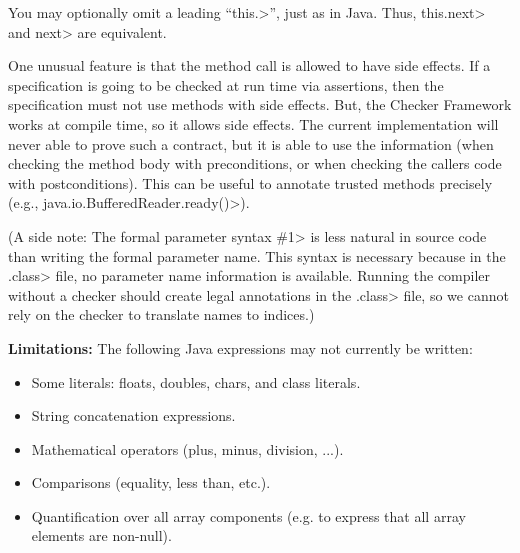 You may optionally omit a leading ``\<this.>'', just as in Java.  Thus, 
\<this.next> and \<next> are equivalent.

One unusual feature is that the method call is allowed to have side
effects.  If a specification is going to be checked at run time via
assertions, then the specification must not use methods with side
effects.  But, the Checker Framework works at compile time, so it allows
side effects.
The current implementation will never able to prove such
a contract, but it is able to use the information (when checking
the method body with preconditions, or when checking the callers
code with postconditions).  This can be useful to annotate trusted
methods precisely (e.g., \<java.io.BufferedReader.ready()>).


(A side note:  The formal parameter syntax \<\#1> is less natural in source code
than writing the formal parameter name.  This syntax is necessary because
in the \<.class> file, no parameter name information is available.  Running
the compiler without a checker should create legal annotations in the
\<.class> file, so we cannot rely on the checker to translate names to
indices.)


\textbf{Limitations:}
The following Java expressions may not currently be written:
\begin{itemize}
\item Some literals:  floats, doubles, chars, and class literals.
\item String concatenation expressions.
\item Mathematical operators (plus, minus, division, ...).
\item Comparisons (equality, less than, etc.).
\item Quantification over all array components (e.g. to express that all
  array elements are non-null).
\end{itemize}



